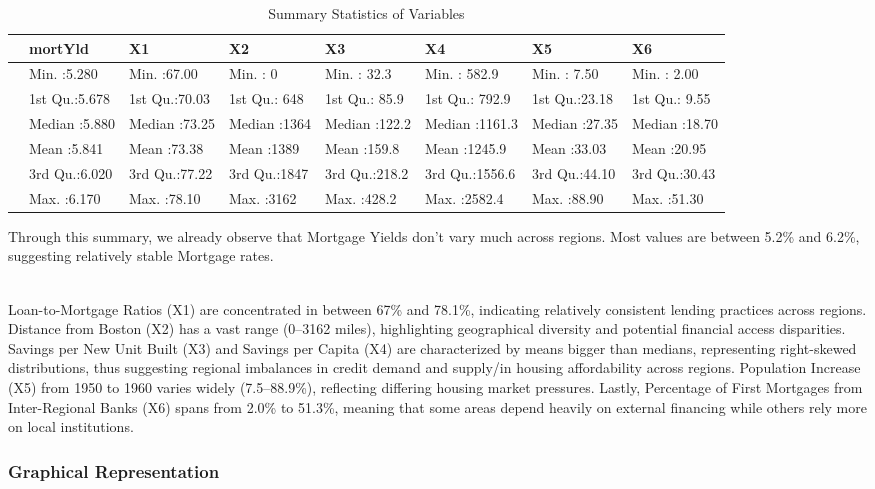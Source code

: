 \documentclass[
  11pt,
]{article}
\begin{document}
\begin{longtable}[t]{llllllll}
\caption{\label{tab:unnamed-chunk-3}Summary Statistics of Variables}\\
\toprule
 & mortYld & X1 & X2 & X3 & X4 & X5 & X6\\
\midrule
 & Min.   :5.280 & Min.   :67.00 & Min.   :   0 & Min.   : 32.3 & Min.   : 582.9 & Min.   : 7.50 & Min.   : 2.00\\
 & 1st Qu.:5.678 & 1st Qu.:70.03 & 1st Qu.: 648 & 1st Qu.: 85.9 & 1st Qu.: 792.9 & 1st Qu.:23.18 & 1st Qu.: 9.55\\
 & Median :5.880 & Median :73.25 & Median :1364 & Median :122.2 & Median :1161.3 & Median :27.35 & Median :18.70\\
 & Mean   :5.841 & Mean   :73.38 & Mean   :1389 & Mean   :159.8 & Mean   :1245.9 & Mean   :33.03 & Mean   :20.95\\
 & 3rd Qu.:6.020 & 3rd Qu.:77.22 & 3rd Qu.:1847 & 3rd Qu.:218.2 & 3rd Qu.:1556.6 & 3rd Qu.:44.10 & 3rd Qu.:30.43\\
\addlinespace
 & Max.   :6.170 & Max.   :78.10 & Max.   :3162 & Max.   :428.2 & Max.   :2582.4 & Max.   :88.90 & Max.   :51.30\\
\bottomrule
\end{longtable}
\endgroup{}

Through this summary, we already observe that Mortgage Yields don't vary
much across regions. Most values are between 5.2\% and 6.2\%, suggesting
relatively stable Mortgage rates.\\
\strut \\
Loan-to-Mortgage Ratios (X1) are concentrated in between 67\% and
78.1\%, indicating relatively consistent lending practices across
regions. Distance from Boston (X2) has a vast range (0--3162 miles),
highlighting geographical diversity and potential financial access
disparities. Savings per New Unit Built (X3) and Savings per Capita (X4)
are characterized by means bigger than medians, representing
right-skewed distributions, thus suggesting regional imbalances in
credit demand and supply/in housing affordability across regions.
Population Increase (X5) from 1950 to 1960 varies widely (7.5--88.9\%),
reflecting differing housing market pressures. Lastly, Percentage of
First Mortgages from Inter-Regional Banks (X6) spans from 2.0\% to
51.3\%, meaning that some areas depend heavily on external financing
while others rely more on local institutions.

\subsubsection{Graphical Representation}\label{graphical-representation}
\end{document}
